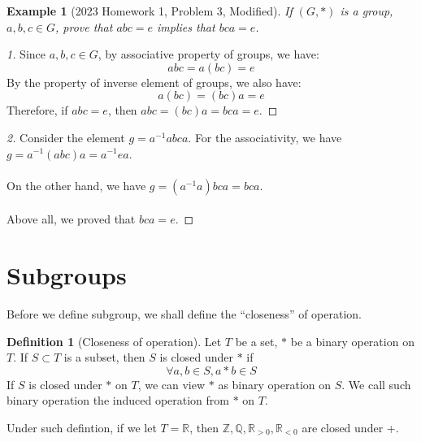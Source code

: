 \documentclass{article}
\theoremstyle{MyNonumberplain}
\theoremstyle{break}
\newtheorem*{proof}{Proof. }
\theoremstyle{break}
\newtheorem{example}{Example}[section]
\theoremstyle{break}
\theoremstyle{definition}
\theoremstyle{break}
\newtheorem{definition}{Definition}[section]
\begin{document}
\begin{expbox}
    \begin{example}[2023 Homework 1, Problem 3, Modified]
        If $(G, *)$ is a group, $a, b, c \in G$, prove that $abc = e$ implies that $bca = e$. 
    \end{example}
    \begin{prfbox}
        \begin{proof}[1]
            Since $a,b,c\in G$, by associative property of groups, we have:
            $$abc=a(bc)=e$$
            By the property of inverse element of groups, we also have:
            $$a(bc)=(bc)a=e$$
            Therefore, if $abc=e$, then $abc=(bc)a=bca=e$.              
        \end{proof}
    \end{prfbox}
    \begin{prfbox}
        \begin{proof}[2]
            Consider the element $g=a^{-1}abca$. For the associativity, we have $g=a^{-1}(abc)a=a^{-1}ea$.\\\\
            On the other hand, we have $g=(a^{-1}a)bca=bca$.\\\\
            Above all, we proved that $bca=e$.
        \end{proof}
    \end{prfbox}
\end{expbox}

\newpage

\section{Subgroups}

Before we define subgroup, we shall define the ``closeness'' of operation.

\begin{defbox}
    \begin{definition}[Closeness of operation]
        Let $T$ be a set, $*$ be a binary operation on $T$. If $S\subset T$ is a subset, then $S$ is closed under $*$ if 
        $$\forall a,b\in S, a*b\in S$$
        If $S$ is closed under $\ast$ on $T$, we can view $\ast$ as binary operation on $S$. We call such binary operation the induced operation from $\ast$ on
$T$.
    \end{definition}
\end{defbox}

Under such defintion, if we let $T =\mathbb{R}$, then $\mathbb{Z}, \mathbb{Q},
\mathbb{R}_{> 0}, \mathbb{R}_{< 0}$ are closed under +.
\end{document}
